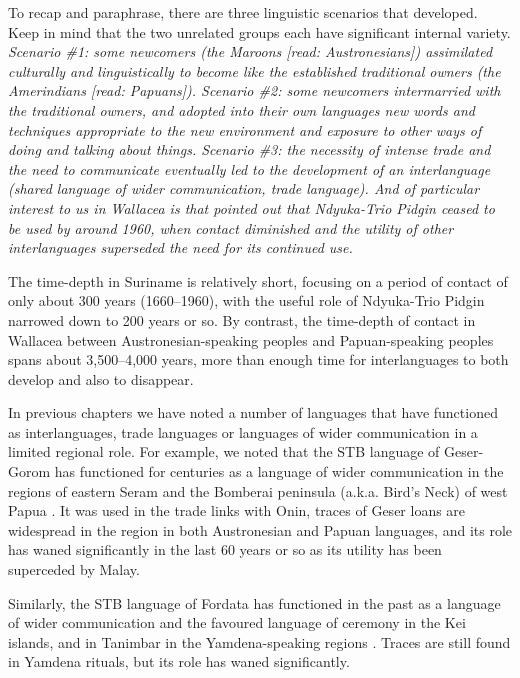 To recap and paraphrase, there are three linguistic scenarios that developed.
Keep in mind that the two unrelated groups each have significant internal variety.
\it{Scenario {\#}1}: some newcomers (the Maroons [read: Austronesians])
assimilated culturally and linguistically to become like the established traditional
owners (the Amerindians [read: Papuans]).
\it{Scenario {\#}2}: some newcomers intermarried with the traditional
owners, and adopted into their own languages new words
and techniques appropriate to the new environment
and exposure to other ways of doing
and talking about things.
\it{Scenario {\#}3}: the necessity of intense trade
and the need to communicate eventually led to the development
of an interlanguage (shared language of wider communication, trade language).
And of particular interest to us in Wallacea is that \citet{HuttarVelantie1997}
pointed out that Ndyuka-Trio Pidgin ceased to be used by around
1960, when contact diminished and the utility of other interlanguages
superseded the need for its continued use.

The time-depth in Suriname is relatively short,
focusing on a period of contact of only about 300 years (1660--1960),
with the useful role of Ndyuka-Trio Pidgin narrowed down to 200 years or so.
By contrast, the time-depth of contact in Wallacea between Austronesian-speaking
peoples and Papuan-speaking peoples spans about 3,500--4,000 years,
more than enough time for interlanguages to both develop
and also to disappear.

In previous chapters we have noted a number of languages that
have functioned as interlanguages,
trade languages or languages of wider communication in a limited regional role.
For example, we noted that the STB language of Geser-Gorom has
functioned for centuries as a language of wider communication
in the regions of eastern Seram
and the Bomberai peninsula (a.k.a.
Bird’s Neck) of west Papua
\citep{LoskiLoski1989,WalkerWalker1991}.
It was used in the trade links with Onin,
traces of Geser loans are widespread in the region in both Austronesian
and Papuan languages, and its role has waned significantly in
the last 60 years or so as its utility has been superceded by Malay.

Similarly, the STB language of Fordata has functioned in the
past as a language of wider communication
and the favoured language of ceremony in the Kei islands,
and in Tanimbar in the Yamdena-speaking regions \citep{Hughes1987,McKinnon1991}.
Traces are still found in Yamdena rituals,
but its role has waned significantly.

